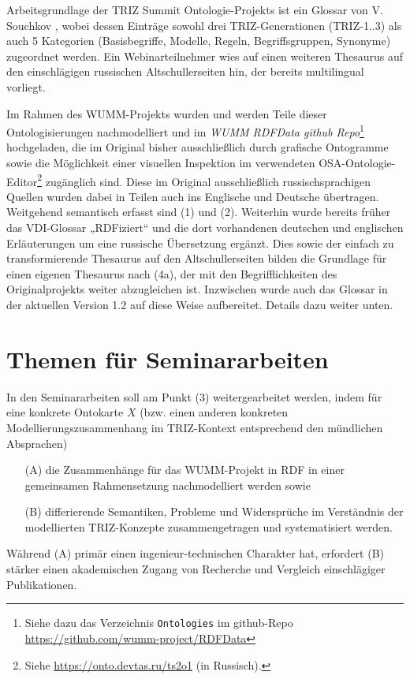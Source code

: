 \documentclass[11pt,a4paper]{article}
\begin{document}
Arbeitsgrundlage der TRIZ Summit Ontologie-Projekts ist ein Glossar von
V. Souchkov \cite{SG}, wobei dessen Einträge sowohl drei TRIZ-Generationen
(TRIZ-1..3) als auch 5 Kategorien (Basisbegriffe, Modelle, Regeln,
Begriffsgruppen, Synonyme) zugeordnet werden. Ein Webinarteilnehmer wies auf
einen weiteren Thesaurus \cite{GSA} auf den einschlägigen russischen
Altschullerseiten hin, der bereits multilingual vorliegt.

Im Rahmen des WUMM-Projekts wurden und werden Teile dieser Ontologisierungen
nachmodelliert und im \emph{WUMM RDFData github Repo}\footnote{Siehe dazu das
  Verzeichnis \texttt{Ontologies} im github-Repo
  \url{https://github.com/wumm-project/RDFData}} hochgeladen, die im Original
bisher ausschließlich durch grafische Ontogramme sowie die Möglichkeit einer
visuellen Inspektion im verwendeten OSA-Ontologie-Editor\footnote{Siehe
  \url{https://onto.devtas.ru/ts2o1} (in Russisch).} zugänglich sind.  Diese
im Original ausschließlich russischsprachigen Quellen wurden dabei in Teilen
auch ins Englische und Deutsche übertragen.  Weitgehend semantisch erfasst
sind (1) und (2). Weiterhin wurde bereits früher das VDI-Glossar „RDFiziert“
und die dort vorhandenen deutschen und englischen Erläuterungen um eine
russische Übersetzung ergänzt. Dies sowie der einfach zu transformierende
Thesaurus auf den Altschullerseiten bilden die Grundlage für einen eigenen
Thesaurus nach (4a), der mit den Begriff\-lichkeiten des Originalprojekts
weiter abzugleichen ist.  Inzwischen wurde auch das Glossar \cite{SG} in der
aktuellen Version 1.2 auf diese Weise aufbereitet.  Details dazu weiter unten.

\section{Themen für Seminararbeiten}

In den Seminararbeiten soll am Punkt (3) weitergearbeitet werden, indem für
eine konkrete Ontokarte $X$ (bzw. einen anderen konkreten
Modellierungszusammenhang im TRIZ-Kontext entsprechend den mündlichen
Absprachen)
\begin{itemize}[noitemsep]
\item[(A)] die Zusammenhänge für das WUMM-Projekt in RDF in einer gemeinsamen
  Rahmensetzung nachmodelliert werden sowie
\item[(B)] differierende Semantiken, Probleme und Widersprüche im Verständnis
  der modellierten TRIZ-Konzepte zusammengetragen und systematisiert werden.  
\end{itemize}
Während (A) primär einen ingenieur-technischen Charakter hat, erfordert (B)
stärker einen akademischen Zugang von Recherche und Vergleich einschlägiger
Publikationen.
\end{document}
